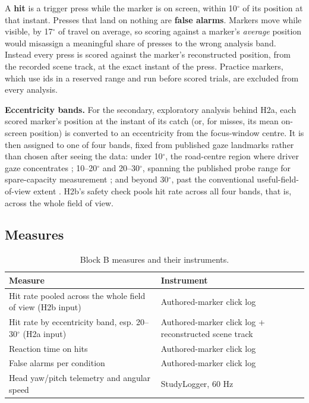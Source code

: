 A \textbf{hit} is a trigger press while the marker is on screen, within 10$^{\circ}$ of its position at
that instant. Presses that land on nothing are \textbf{false alarms}. Markers move while visible, by
17$^{\circ}$ of travel on average, so scoring against a marker's \textit{average} position would
misassign a meaningful share of presses to the wrong analysis band. Instead every press is scored
against the marker's reconstructed position, from the recorded scene track, at the exact instant of
the press. Practice markers, which use ids in a reserved range and run before scored trials, are
excluded from every analysis.

\textbf{Eccentricity bands.} For the secondary, exploratory analysis behind H2a, each scored marker's
position at the instant of its catch (or, for misses, its mean on-screen position) is converted to an
eccentricity from the focus-window centre. It is then assigned to one of four bands, fixed from
published gaze landmarks rather than chosen after seeing the data: under 10$^{\circ}$, the road-centre
region where driver gaze concentrates \citep{victor2005}; 10–20$^{\circ}$ and 20–30$^{\circ}$, spanning
the published probe range for spare-capacity measurement \citep{jahn2005,iso2016}; and beyond 30$^{\circ}$,
past the conventional useful-field-of-view extent \citep{ball1993}. H2b's safety check pools hit
rate across all four bands, that is, across the whole field of view.

\subsection{Measures}

\begin{longtable}{p{}|p{}}
\caption{Block B measures and their instruments.}\\
\hline
\textbf{Measure} & \textbf{Instrument} \\
\hline
\endhead
\hline
Hit rate pooled across the whole field of view (H2b input) & Authored-marker click log \\
Hit rate by eccentricity band, esp. 20–30$^{\circ}$ (H2a input) & Authored-marker click log + reconstructed scene track \\
Reaction time on hits & Authored-marker click log \\
False alarms per condition & Authored-marker click log \\
Head yaw/pitch telemetry and angular speed & StudyLogger, 60 Hz \\
\hline
\end{longtable}

